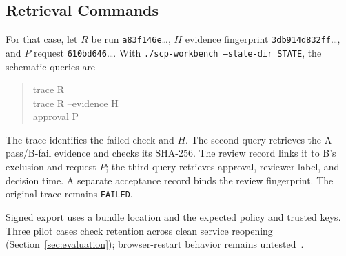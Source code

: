 \subsection{Retrieval Commands}
For that case, let $R$ be run \texttt{a83f146e}\ldots, $H$ evidence fingerprint \texttt{3db914d832ff}\ldots, and $P$ request \texttt{610bd646}\ldots. With \texttt{./scp-workbench --state-dir STATE}, the schematic queries are
\begin{quote}\small\ttfamily
trace R\\
trace R --evidence H\\
approval P
\end{quote}
The trace identifies the failed check and $H$. The second query retrieves the A-pass/B-fail evidence and checks its SHA-256. The review record links it to B's exclusion and request $P$; the third query retrieves approval, reviewer label, and decision time. A separate acceptance record binds the review fingerprint. The original trace remains \texttt{FAILED}.

Signed export uses a bundle location and the expected policy and trusted keys. Three pilot cases check retention across clean service reopening (Section~\ref{sec:evaluation}); browser-restart behavior remains untested~\cite{scpCheckpoint}.
